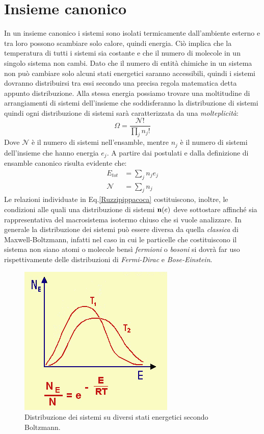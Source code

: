 \documentclass[oneside]{amsbook}
\numberwithin{section}{chapter}
\numberwithin{equation}{section}
\numberwithin{figure}{section}
\begin{document}
\section{Insieme canonico}
In un insieme canonico i sistemi sono isolati termicamente dall'ambiente esterno e tra loro possono scambiare solo calore, quindi energia. Ciò implica che la temperatura di tutti i sistemi sia costante e che il numero di molecole in un singolo sistema non cambi. Dato che il numero di entità chimiche in un sistema non può cambiare solo alcuni stati energetici saranno accessibili, quindi i sistemi dovranno distribuirsi tra essi secondo una precisa regola matematica detta appunto distribuzione.
Alla stessa energia possiamo trovare una moltitudine di arrangiamenti di sistemi dell'insieme che soddisferanno la distribuzione di sistemi quindi ogni distribuzione di sistemi sarà caratterizzata da una \emph{molteplicità}: 
\begin{equation}
\Omega=\frac{\mathcal{N}!}{\prod_j n_j!}
\end{equation}
Dove $\mathcal{N}$ è il numero di sistemi nell'ensamble, mentre $n_j$ è il numero di sistemi dell'insieme che hanno energia $e_j$.
A partire dai postulati e dalla definizione di ensamble canonico risulta evidente che:
\begin{equation}
\label{Ruzzipippacoca}
\begin{aligned}
E_{tot}&= \sum_j n_je_j\\
\mathcal{N}&= \sum_j n_j
\end{aligned}
\end{equation}
Le relazioni individuate in Eq.\ref{Ruzzipippacoca} costituiscono, inoltre, le condizioni alle quali una distribuzione di sistemi $\bold{n}(e)$ deve sottostare affinché sia rappresentativa del macrosistema isotermo chiuso che si vuole analizzare. In generale la distribuzione dei sistemi può essere diversa da quella \emph{classica} di Maxwell-Boltzmann, infatti nel caso in cui le particelle che costituiscono il sistema non siano atomi o molecole bensì \emph{fermioni} o \emph{bosoni} si dovrà far uso rispettivamente delle distribuzioni di \emph{Fermi-Dirac} e \emph{Bose-Einstein}.  
\begin{figure}[H]
\centering
\caption{Distribuzione dei sistemi su diversi stati energetici secondo Boltzmann.}\label{mxwldis}
\includegraphics[scale=0.5]{maxwel1}
\end{figure}
\end{document}
